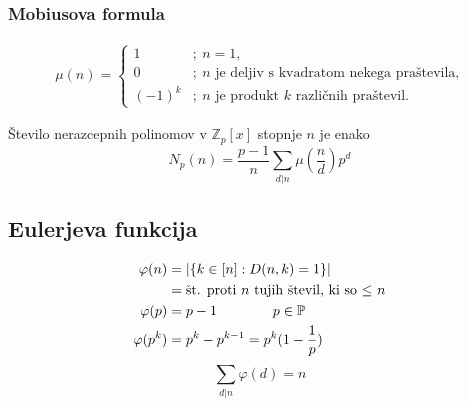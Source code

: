 	\subsubsection*{Mobiusova formula}
	\begin{align*}
		\mu(n) = \begin{cases}
			1 &;\ n = 1, \\
			0 &;\ \text{$n$ je deljiv s kvadratom nekega praštevila,} \\
			(-1)^k &;\ \text{$n$ je produkt $k$ različnih praštevil.}
		\end{cases}
	\end{align*}

	Število nerazcepnih polinomov v $\mathbb{Z}_p[x]$ stopnje $n$ je enako
	\[ N_p(n) = \frac{p-1}{n} \sum_{d|n} \mu(\frac{n}{d}) p^d\]

	\subsection*{Eulerjeva funkcija}
	\[ 
		\begin{aligned}
			\varphi (n) &= |\{k\in [n] : D(n,k) = 1 \}| \\
					&= \textmd{št. proti $n$ tujih števil, ki so $\leq$ $n$} \\
			\varphi(p) &= p-1 \qquad \qquad p \in \mathbb{P}\\
			\varphi(p^k) &= p^k-p^{k-1} = p^k(1-\frac{1}{p})\\
		\end{aligned}
	\]
	\[\sum_{d|n} \varphi(d) = n\]
